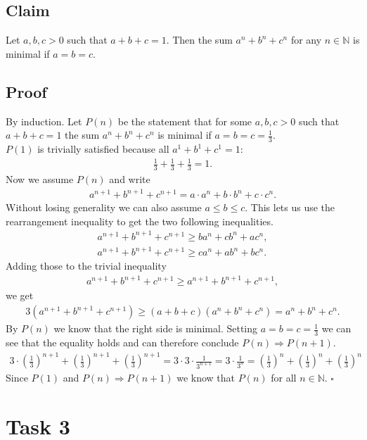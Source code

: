 \documentclass{article}
\begin{document}
\subsection*{Claim} Let $a,b,c>0$ such that $a+b+c=1$. Then the sum $a^n+b^n+c^n$ for any $n\in\mathbb{N}$ is minimal if $a=b=c$.
\subsection*{Proof}
By induction. Let $P(n)$ be the statement that for some $a,b,c>0$ such that $a+b+c=1$ the sum $a^n+b^n+c^n$ is minimal if $a=b=c=\frac{1}{3}$.\\
$P(1)$ is trivially satisfied because all $a^1+b^1+c^1=1$:
\begin{align*}
  \frac{1}{3}+\frac{1}{3}+\frac{1}{3}=1.
\end{align*}
Now we assume $P(n)$ and write 
\begin{align*}
  a^{n+1}+b^{n+1}+c^{n+1}=a\cdot a^n+b\cdot b^n + c\cdot c^n.
\end{align*}
Without losing generality we can also assume $a\leq b\leq c$.
This lets us use the rearrangement inequality to get the two following inequalities.
\begin{align*}
  a^{n+1}+b^{n+1}+c^{n+1}\geq ba^n+cb^n+ac^n,\\
  a^{n+1}+b^{n+1}+c^{n+1}\geq ca^n+ab^n+bc^n.
\end{align*}
Adding those to the trivial inequality
\begin{align*}
  a^{n+1}+b^{n+1}+c^{n+1}\geq a^{n+1}+b^{n+1}+c^{n+1},
\end{align*}
we get
\begin{align*}
  3(a^{n+1}+b^{n+1}+c^{n+1})\geq (a+b+c)(a^n+b^n+c^n) = a^n+b^n+c^n.
\end{align*}
By $P(n)$ we know that the right side is minimal. Setting $a=b=c=\frac{1}{3}$ we can see that the equality holds and can therefore conclude $P(n)\Rightarrow P(n+1)$.
\begin{align*}
  3\cdot\left(\frac{1}{3}\right)^{n+1}+\left(\frac{1}{3}\right)^{n+1}+\left(\frac{1}{3}\right)^{n+1}=3\cdot3\cdot\frac{1}{3^{n+1}}=3\cdot\frac{1}{3^n}=\left(\frac{1}{3}\right)^n+\left(\frac{1}{3}\right)^n+\left(\frac{1}{3}\right)^n
\end{align*}
Since $P(1)$ and $P(n)\Rightarrow P(n+1)$ we know that $P(n)$ for all $n\in\mathbb{N}$. $\square$
\section*{Task 3}
\end{document}
